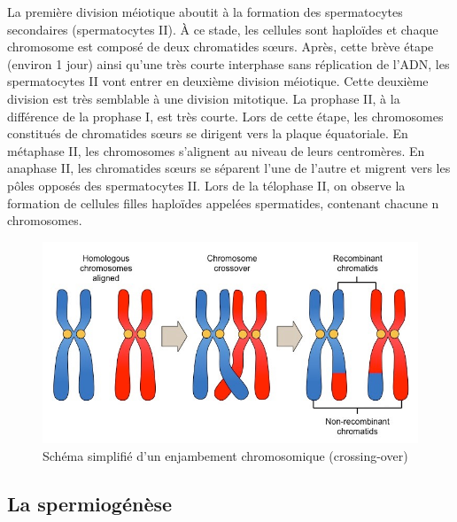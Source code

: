 \documentclass[12pt,twoside]{reedthesis}
\theoremstyle{definition}
\theoremstyle{definition}
\theoremstyle{remark}
\begin{document}
  La première division méiotique aboutit à la formation des spermatocytes
  secondaires (spermatocytes II). À ce stade, les cellules sont haploïdes
  et chaque chromosome est composé de deux chromatides sœurs. Après, cette
  brève étape (environ 1 jour) ainsi qu'une très courte interphase sans
  réplication de l'ADN, les spermatocytes II vont entrer en deuxième
  division méiotique. Cette deuxième division est très semblable à une
  division mitotique. La prophase II, à la différence de la prophase I,
  est très courte. Lors de cette étape, les chromosomes constitués de
  chromatides sœurs se dirigent vers la plaque équatoriale. En métaphase
  II, les chromosomes s'alignent au niveau de leurs centromères. En
  anaphase II, les chromatides sœurs se séparent l'une de l'autre et
  migrent vers les pôles opposés des spermatocytes II. Lors de la
  télophase II, on observe la formation de cellules filles haploïdes
  appelées spermatides, contenant chacune n chromosomes.
  
  \begin{figure}
  
  {\centering \includegraphics[scale=0.35]{figure/crossingover} 
  
  }
  
  \caption{Schéma simplifié d'un enjambement chromosomique (crossing-over)}\label{fig:crossingover}
  \end{figure}
  
  \hypertarget{spermiogenese}{\subsection{La
  spermiogénèse}\label{spermiogenese}}
  
\end{document}
